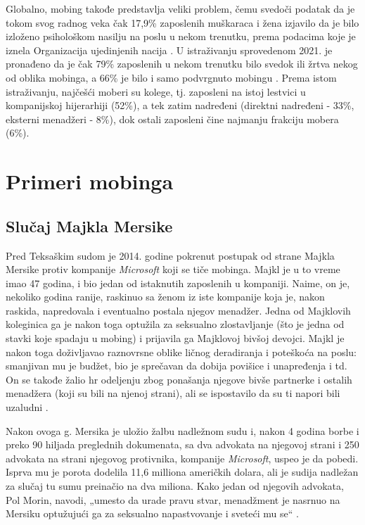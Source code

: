 \documentclass[a4paper]{article}
\newcommand{\quotes}[1]{„#1“}
\begin{document}
    Globalno, mobing takođe predstavlja veliki problem, čemu svedoči podatak da je tokom svog radnog veka čak 17,9\% zaposlenih muškaraca i žena izjavilo da je bilo izloženo psihološkom nasilju na poslu u nekom trenutku, prema podacima koje je iznela Organizacija ujedinjenih nacija \cite{unreport}. U istraživanju sprovedenom 2021. je pronađeno da je čak 79\% zaposlenih u nekom trenutku bilo svedok ili žrtva nekog od oblika mobinga, a 66\% je bilo i samo podvrgnuto mobingu \cite{wpeareport}. Prema istom istraživanju, najčešći moberi su kolege, tj. zaposleni na istoj lestvici u kompanijskoj hijerarhiji (52\%), a tek zatim nadređeni (direktni nadređeni - 33\%, eksterni menadžeri - 8\%), dok ostali zaposleni čine najmanju frakciju mobera (6\%).
    
    \section{Primeri mobinga}
    
    \subsection{Slučaj Majkla Mersike}
    
    Pred Teksaškim sudom je 2014. godine pokrenut postupak od strane Majkla Mersike protiv kompanije \textit{Microsoft} koji se tiče mobinga. Majkl je u to vreme imao 47 godina, i bio jedan od istaknutih zaposlenih u kompaniji. Naime, on je, nekoliko godina ranije, raskinuo sa ženom iz iste kompanije koja je, nakon raskida, napredovala i eventualno postala njegov menadžer. Jedna od Majklovih koleginica ga je nakon toga optužila za seksualno zlostavljanje (što je jedna od stavki koje spadaju u mobing) i prijavila ga Majklovoj bivšoj devojci. Majkl je nakon toga doživljavao raznovrsne oblike ličnog deradiranja i poteškoća na poslu: smanjivan mu je budžet, bio je sprečavan da dobija povišice i unapređenja i td. On se takođe žalio \acrshort{hr} odeljenju zbog ponašanja njegove bivše partnerke i ostalih menadžera (koji su bili na njenoj strani), ali se ispostavilo da su ti napori bili uzaludni \cite{mercieca1}.
    
    Nakon ovoga g. Mersika je uložio žalbu nadležnom sudu i, nakon 4 godina borbe i preko 90 hiljada preglednih dokumenata, sa dva advokata na njegovoj strani i 250 advokata na strani njegovog protivnika, kompanije \textit{Microsoft}, uspeo je da pobedi. Isprva mu je porota dodelila 11,6 milliona američkih dolara, ali je sudija nadležan za slučaj tu sumu preinačio na dva miliona. Kako jedan od njegovih advokata, Pol Morin, navodi, \quotes{umesto da urade pravu stvar, menadžment je nasrnuo na Mersiku optužujući ga za seksualno napastvovanje i sveteći mu se} \cite{mercieca2}.
    
\end{document}
